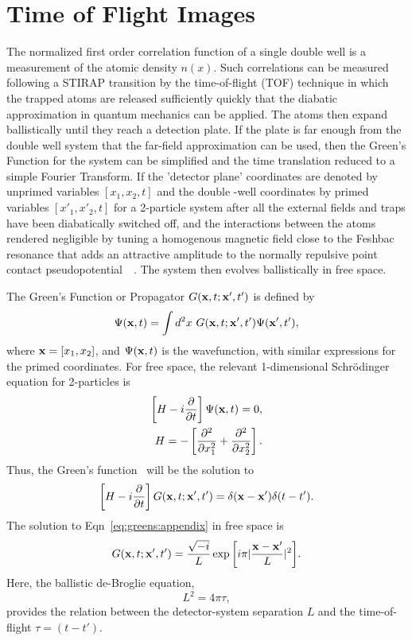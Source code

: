 \section{\label{sec:2:appendixtof} Time of Flight Images} 
%
%
The normalized first order correlation function of a single double well is a measurement of the atomic density $n(x)$. Such correlations can be measured following a STIRAP transition by the time-of-flight (TOF) technique in which the trapped atoms are released sufficiently quickly  that the diabatic approximation in quantum mechanics can be applied. The atoms then expand ballistically until they reach a detection plate. If the plate is far enough from the double well system that the far-field approximation can be used, then the Green's Function for the system can be simplified and the time translation reduced to a simple Fourier Transform.  If the 'detector plane' coordinates are denoted by unprimed variables $\left[ x_1,x_2,t \right]$ and the double -well coordinates by primed variables $\left[ x'_1,x'_2,t \right]$ for a 2-particle system after all the external fields and traps have been diabatically switched off, and the interactions between the atoms rendered negligible by tuning a homogenous magnetic field close to the Feshbac resonance that adds an attractive amplitude to the normally repulsive point contact pseudopotential~\cite{feshbach:resonance}~\cite{pethick:bec}. The system then evolves ballistically in free space. 

The Green's Function or Propagator $G({\bf x},t;{\bf x}',t')$ is defined by
\begin{equation}
\Psi ({\bf x},t) = \int d^2x \mbox{ } G({\bf x},t;{\bf x}',t') \Psi ({\bf x}',t'),
\label{eq:greensfunction:appendix}
\end{equation}
where ${\bf x} = \left[ x_1, x_2 \right]$, and $\Psi({\bf x},t)$ is the wavefunction, with similar expressions for the primed coordinates. For free space, the relevant 1-dimensional Schr\"odinger equation for 2-particles is
\begin{eqnarray}
\left[ H-i\frac{\partial}{\partial t} \right] \Psi({\bf x},t) =0, \nonumber \\
H=-\left[ \frac{\partial^2}{\partial x^2_1} + \frac{\partial^2}{\partial x^2_2} \right].
\end{eqnarray}
 Thus, the Green's function~\cite{sakurai} will be the solution to
 \begin{equation}
 \left[ H-i\frac{\partial}{\partial t} \right] G({\bf x},t;{\bf x}',t') = \delta ({\bf x}-{\bf x}') \delta (t-t').
 \label{eq:greens:appendix}
 \end{equation}
The solution to Eqn~\ref{eq:greens:appendix} in free space is
\begin{equation}
G({\bf x},t;{\bf x}',t') = \frac{\sqrt{-i}}{L} \exp{\left[ i\pi | \frac{{\bf x}-{\bf x}'}{L}|^2 \right]}.
\label{eq:greensfn:appendix}
\end{equation}
Here, the ballistic de-Broglie equation,
\begin{equation}
L^2=4 \pi \tau,
\label{eq:debroglie:appendixtof}
\end{equation}
 provides the relation between the detector-system separation $L$ and the time-of-flight $\tau=\left(t-t'\right)$.


